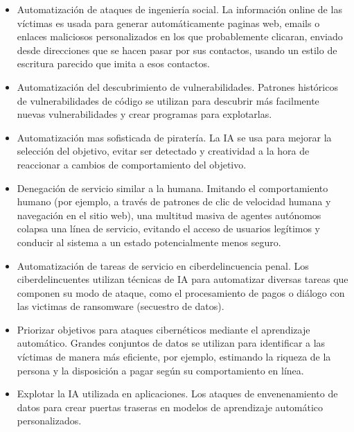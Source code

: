 \documentclass[12pt,a4paper]{article}
\begin{document}
\begin{itemize}

\item Automatización de ataques de ingeniería social. La información online de las víctimas es usada para generar automáticamente paginas web, emails o enlaces maliciosos personalizados en los que probablemente clicaran, enviado desde direcciones que se hacen pasar por sus contactos, usando un estilo de escritura parecido que imita a esos contactos.

\item Automatización del descubrimiento de vulnerabilidades. Patrones históricos de vulnerabilidades de código se utilizan para descubrir más facilmente nuevas vulnerabilidades y crear programas para explotarlas.

\item Automatización mas sofisticada de piratería. La IA se usa para mejorar la selección del objetivo, evitar ser detectado y creatividad a la hora de reaccionar a cambios de comportamiento del objetivo.

\item Denegación de servicio similar a la humana. Imitando el comportamiento humano (por ejemplo, a través de patrones de clic de velocidad humana y navegación en el sitio web), una multitud masiva de agentes autónomos colapsa una línea de servicio, evitando el acceso de usuarios legítimos y conducir al sistema a un estado potencialmente menos seguro.

\item Automatización de tareas de servicio en ciberdelincuencia penal. Los ciberdelincuentes utilizan técnicas de IA para automatizar diversas tareas que componen su modo de ataque, como el procesamiento de pagos o diálogo con las victimas de ransomware (secuestro de datos).

\item Priorizar objetivos para ataques cibernéticos mediante el aprendizaje automático. Grandes conjuntos de datos se utilizan para identificar a las víctimas de manera más eficiente, por ejemplo, estimando la riqueza de la persona y la disposición a pagar según su comportamiento en línea.

\item Explotar la IA utilizada en aplicaciones. Los ataques de envenenamiento de datos para crear puertas traseras en modelos de aprendizaje automático personalizados.

\end{itemize}
\end{document}
